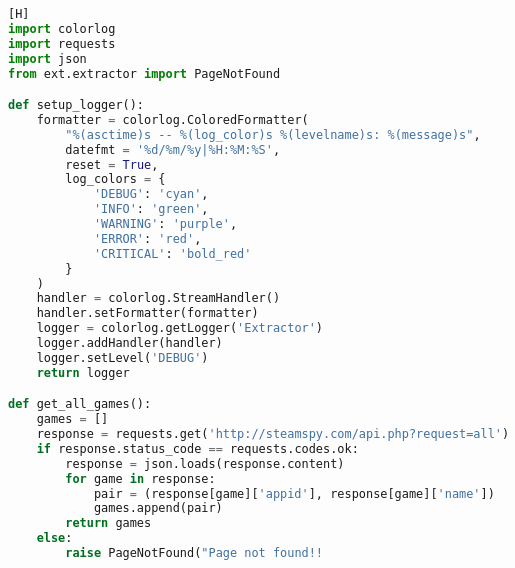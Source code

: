 \begin{lstlisting}[language={Python}, caption = {Código do \textit{\textbf{Utils}}}, label = {code:utils}] [H]
import colorlog
import requests
import json
from ext.extractor import PageNotFound

def setup_logger():
	formatter = colorlog.ColoredFormatter(
		"%(asctime)s -- %(log_color)s %(levelname)s: %(message)s",
		datefmt = '%d/%m/%y|%H:%M:%S',
		reset = True,
		log_colors = {
			'DEBUG': 'cyan',
			'INFO': 'green',
			'WARNING': 'purple',
			'ERROR': 'red',
			'CRITICAL': 'bold_red'
		}
	)
	handler = colorlog.StreamHandler()
	handler.setFormatter(formatter)
	logger = colorlog.getLogger('Extractor')
	logger.addHandler(handler)
	logger.setLevel('DEBUG')
	return logger

def get_all_games():
	games = []
	response = requests.get('http://steamspy.com/api.php?request=all')
	if response.status_code == requests.codes.ok:
		response = json.loads(response.content)
		for game in response:
			pair = (response[game]['appid'], response[game]['name'])
			games.append(pair)
		return games
	else:
		raise PageNotFound("Page not found!!
\end{lstlisting}
